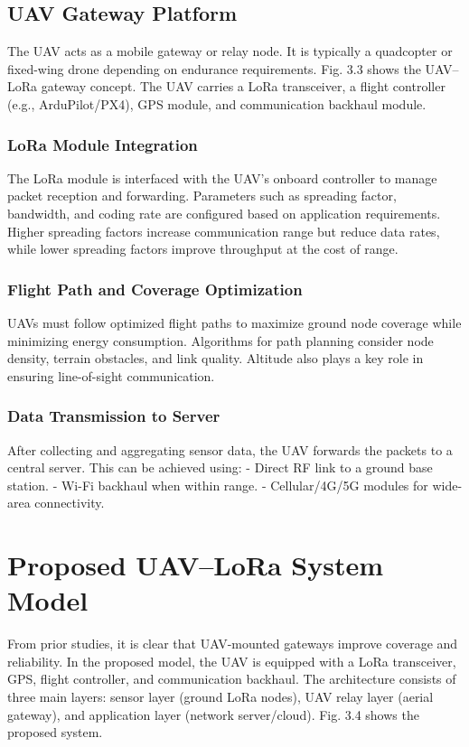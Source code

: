 \subsection{UAV Gateway Platform}
The UAV acts as a mobile gateway or relay node. It is typically a quadcopter or fixed-wing drone depending on endurance requirements. Fig. 3.3 shows the UAV–LoRa gateway concept. The UAV carries a LoRa transceiver, a flight controller (e.g., ArduPilot/PX4), GPS module, and communication backhaul module.


\subsubsection{LoRa Module Integration}
The LoRa module is interfaced with the UAV’s onboard controller to manage packet reception and forwarding. Parameters such as spreading factor, bandwidth, and coding rate are configured based on application requirements. Higher spreading factors increase communication range but reduce data rates, while lower spreading factors improve throughput at the cost of range.

\subsubsection{Flight Path and Coverage Optimization}
UAVs must follow optimized flight paths to maximize ground node coverage while minimizing energy consumption. Algorithms for path planning consider node density, terrain obstacles, and link quality. Altitude also plays a key role in ensuring line-of-sight communication.

\subsubsection{Data Transmission to Server}
After collecting and aggregating sensor data, the UAV forwards the packets to a central server. This can be achieved using:  
- Direct RF link to a ground base station.  
- Wi-Fi backhaul when within range.  
- Cellular/4G/5G modules for wide-area connectivity.  

\section{Proposed UAV–LoRa System Model}
From prior studies, it is clear that UAV-mounted gateways improve coverage and reliability. In the proposed model, the UAV is equipped with a LoRa transceiver, GPS, flight controller, and communication backhaul. The architecture consists of three main layers: sensor layer (ground LoRa nodes), UAV relay layer (aerial gateway), and application layer (network server/cloud). Fig. 3.4 shows the proposed system.

